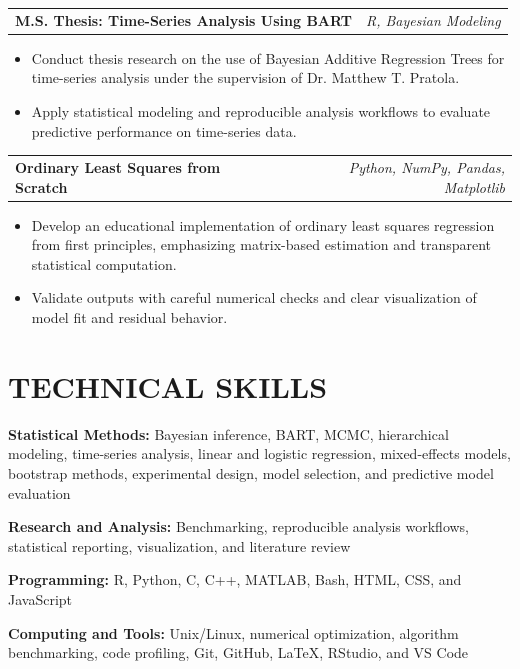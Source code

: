 \documentclass[10pt,letterpaper]{article}
\makeatletter
\newcommand{\projectEntry}[2]{%
  \begin{tabularx}{\textwidth}{@{}Xr@{}}
    \textbf{#1} & \textit{#2}
  \end{tabularx}%
}
\newenvironment{resumeItems}{%
  \begin{itemize}[
    label=\textbullet,
    leftmargin=14pt,
    labelsep=5pt,
    itemsep=0.5pt,
    topsep=1.0pt,
    parsep=0pt,
    partopsep=0pt
  ]
}{%
  \end{itemize}
}
\makeatother
\begin{document}
\projectEntry
  {M.S. Thesis: Time-Series Analysis Using BART}
  {R, Bayesian Modeling}

\begin{resumeItems}
  \item Conduct thesis research on the use of Bayesian Additive Regression Trees for time-series analysis under the supervision of Dr. Matthew T. Pratola.

  \item Apply statistical modeling and reproducible analysis workflows to evaluate predictive performance on time-series data.
\end{resumeItems}

\vspace{0.7pt}

\projectEntry
  {Ordinary Least Squares from Scratch}
  {Python, NumPy, Pandas, Matplotlib}

\begin{resumeItems}
  \item Develop an educational implementation of ordinary least squares regression from first principles, emphasizing matrix-based estimation and transparent statistical computation.

  \item Validate outputs with careful numerical checks and clear visualization of model fit and residual behavior.
\end{resumeItems}

\section*{TECHNICAL SKILLS}

\textbf{Statistical Methods:}
Bayesian inference, BART, MCMC, hierarchical modeling, time-series analysis, linear and logistic regression, mixed-effects models, bootstrap methods, experimental design, model selection, and predictive model evaluation

\textbf{Research and Analysis:}
Benchmarking, reproducible analysis workflows, statistical reporting, visualization, and literature review

\textbf{Programming:}
R, Python, C, C++, MATLAB, Bash, HTML, CSS, and JavaScript

\textbf{Computing and Tools:}
Unix/Linux, numerical optimization, algorithm benchmarking, code profiling, Git, GitHub, LaTeX, RStudio, and VS Code
\end{document}
